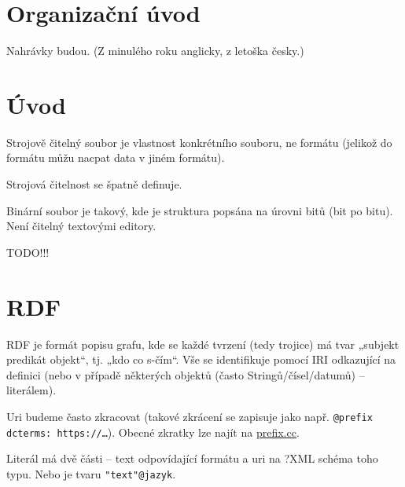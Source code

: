 \documentclass[12pt]{article}					%
\begin{document}

\section*{Organizační úvod}
\begin{poznamka}
	Nahrávky budou. (Z minulého roku anglicky, z letoška česky.)
\end{poznamka}

\section{Úvod}
\begin{definice}
	Strojově čitelný soubor je vlastnost konkrétního souboru, ne formátu (jelikož do formátu můžu nacpat data v jiném formátu).

	Strojová čitelnost se špatně definuje.
\end{definice}

\begin{definice}
	Binární soubor je takový, kde je struktura popsána na úrovni bitů (bit po bitu). Není čitelný textovými editory.
\end{definice}

TODO!!!


\section{RDF}
\begin{definice}
	RDF je formát popisu grafu, kde se každé tvrzení (tedy trojice) má tvar „subjekt predikát objekt“, tj. „kdo co s-čím“. Vše se identifikuje pomocí IRI odkazující na definici (nebo v případě některých objektů (často Stringů/čísel/datumů) -- literálem).
\end{definice}

\begin{poznamka}
	Uri budeme často zkracovat (takové zkrácení se zapisuje jako např. \verb|@prefix dcterms: https://…|). Obecné zkratky lze najít na \url{prefix.cc}.
\end{poznamka}

\begin{definice}[Literál]
	Literál má dvě části -- text odpovídající formátu a uri na ?XML schéma toho typu. Nebo je tvaru \verb|"text"@jazyk|.
\end{definice}
\end{document}
